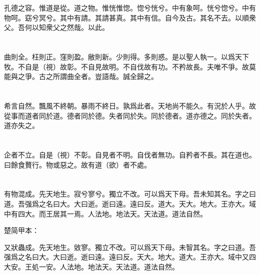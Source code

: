 \documentclass[a5paper]{ctexbook}
\begin{document}
    \chapter{}

    孔德之容。惟道是從。道之物。惟恍惟惚。惚兮恍兮。中有象呵。恍兮惚兮。中有物呵。窈兮冥兮。其中有請。其請甚真。其中有信。自今及古。其名不去。以順衆父。吾何以知衆父之然哉。以此。

    \chapter{}

    曲則全。枉則正。窪則盈。敝則新。少則得。多則惑。是以聖人執一。以爲天下牧。不自是（視）故彰。不自見故明。不自伐故有功。不矜故長。夫唯不爭。故莫能與之爭。古之所謂曲全者。豈語哉。誠全歸之。

    \chapter{}

    希言自然。飄風不終朝。暴雨不終日。孰爲此者。天地尚不能久。有況於人乎。故從事而道者同於道。德者同於德。失者同於失。同於德者。道亦德之。同於失者。道亦失之。

    \chapter{}

    企者不立。自是（視）不彰。自見者不明。自伐者無功。自矜者不長。其在道也。曰餘食贅行。物或惡之。故有道（欲）者不處。

    \chapter{}

    有物混成。先天地生。寂兮寥兮。獨立不改。可以爲天下母。吾未知其名。字之曰道。吾强爲之名曰大。大曰逝。逝曰遠。遠曰反。道大。天大。地大。王亦大。域中有四大。而王居其一焉。人法地。地法天。天法道。道法自然。

    楚简甲本：

    又狀蟲成。先天地生。敓寥。獨立不改。可以爲天下母。未智其名。字之曰道。吾强爲之名曰大。大曰逝。逝曰遠。遠曰反。天大。地大。道大。王亦大。域中又四大安。王処一安。人法地。地法天。天法道。道法自然。

    \chapter{}
\end{document}
